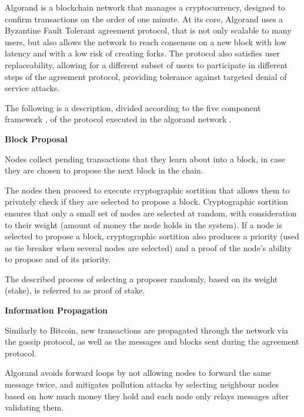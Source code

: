 Algorand \cite{algorand_scale_byz_agreements} \cite{algorand_agreement} is a blockchain network that manages a cryptocurrency, designed to confirm transactions on the order of one minute. At its core, Algorand uses a Byzantine Fault Tolerant agreement protocol, that is not only scalable to many users, but also allows the network to reach consensus on a new block with low latency and with a low risk of creating forks. The protocol also satisfies user replaceability, allowing for a different subset of users to participate in different steps of the agreement protocol, providing tolerance against targeted denial of service attacks.

The following is a description, divided according to the five component framework \cite{survey_bchain_networks}, of the protocol executed in the algorand network \cite{algorand_scale_byz_agreements} \cite{algorand_agreement}.


\vspace{0.5cm}

\textbf{Block Proposal}

Nodes collect pending transactions that they learn about into a block, in case they are chosen to propose the next block in the chain.

The nodes then proceed to execute cryptographic sortition that allows them to privately check if they are selected to propose a block. Cryptographic sortition ensures that only a small set of nodes are selected at random, with consideration to their weight (amount of money the node holds in the system). If a node is selected to propose a block, cryptographic sortition also produces a priority (used as tie breaker when several nodes are selected) and a proof of the node’s ability to propose and of its priority.

The described process of selecting a proposer randomly, based on its weight (stake), is referred to as proof of stake.


\vspace{0.25cm}


\textbf{Information Propagation}

Similarly to Bitcoin, new transactions are propagated through the network via the gossip protocol, as well as the messages and blocks sent during the agreement protocol.

Algorand avoids forward loops by not allowing nodes to forward the same message twice, and mitigates pollution attacks by selecting neighbour nodes based on how much money they hold and each node only relays messages after validating them.


